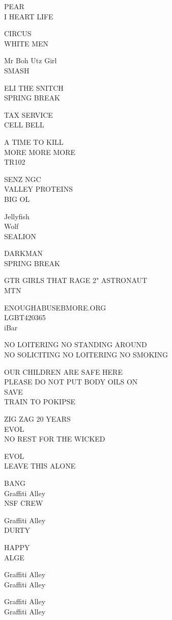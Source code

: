 \documentclass[10pt,letterpaper]{article}
\begin{document}
PEAR\\
I HEART LIFE

CIRCUS\\
WHITE MEN

Mr Boh Utz Girl\\
SMASH

ELI THE SNITCH\\
SPRING BREAK

TAX SERVICE\\
CELL BELL

A TIME TO KILL\\
MORE MORE MORE\\
TR102

SENZ NGC\\
VALLEY PROTEINS\\
BIG OL

Jellyfish\\
Wolf\\
SEALION

DARKMAN\\
SPRING BREAK

GTR GIRLS THAT RAGE 2" ASTRONAUT\\
MTN

ENOUGHABUSEBMORE.ORG\\
LGBT420365\\
iBar

NO LOITERING NO STANDING AROUND\\
NO SOLICITING NO LOITERING NO SMOKING

OUR CHILDREN ARE SAFE HERE\\
PLEASE DO NOT PUT BODY OILS ON\\
SAVE\\
TRAIN TO POKIPSE

ZIG ZAG 20 YEARS\\
EVOL\\
NO REST FOR THE WICKED

EVOL\\
LEAVE THIS ALONE

BANG\\
Graffiti Alley\\
NSF CREW

Graffiti Alley\\
DURTY

HAPPY\\
ALGE

Graffiti Alley\\
Graffiti Alley

Graffiti Alley\\
Graffiti Alley
\end{document}
